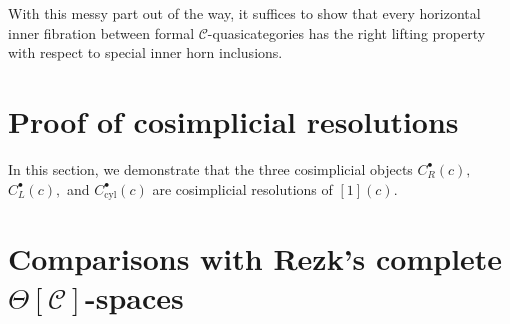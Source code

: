 \documentclass{amsart}
\numberwithin{equation}{section}
\theoremstyle{plain}   %
\theoremstyle{remark}
\theoremstyle{plain}
\newcommand{\C}{\ensuremath{\mathcal{C}}}
\begin{document}
With this messy part out of the way, it suffices to show that every horizontal inner fibration between formal \(\C\)-quasicategories has the right lifting property with respect to special inner horn inclusions.

\section{Proof of cosimplicial resolutions}\label{cosimplicial}
In this section, we demonstrate that the three cosimplicial objects \(C^\bullet_R(c),\) \(C^\bullet_L(c),\) and \(C^\bullet_{\mathrm{cyl}}(c)\) are cosimplicial resolutions of \([1](c)\).
\section{Comparisons with Rezk's complete \(\Theta[\C]\)-spaces}\label{rezkcomparison}
\end{document}
